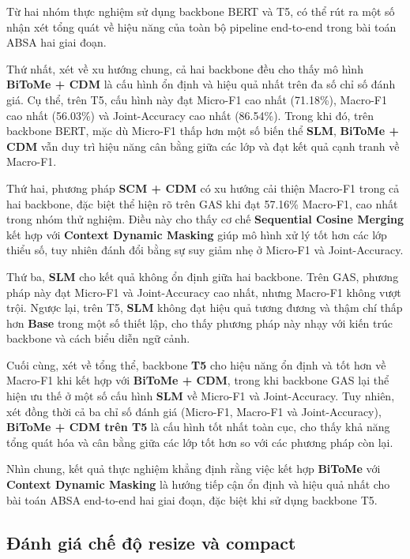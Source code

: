Từ hai nhóm thực nghiệm sử dụng backbone BERT và T5, có thể rút ra một số nhận xét tổng quát về hiệu năng của toàn bộ pipeline end-to-end trong bài toán ABSA hai giai đoạn.

Thứ nhất, xét về xu hướng chung, cả hai backbone đều cho thấy mô hình \textbf{BiToMe + CDM} là cấu hình ổn định và hiệu quả nhất trên đa số chỉ số đánh giá. Cụ thể, trên T5, cấu hình này đạt Micro-F1 cao nhất (71.18\%), Macro-F1 cao nhất (56.03\%) và Joint-Accuracy cao nhất (86.54\%). Trong khi đó, trên backbone BERT, mặc dù Micro-F1 thấp hơn một số biến thể \textbf{SLM}, \textbf{BiToMe + CDM} vẫn duy trì hiệu năng cân bằng giữa các lớp và đạt kết quả cạnh tranh về Macro-F1.

Thứ hai, phương pháp \textbf{SCM + CDM} có xu hướng cải thiện Macro-F1 trong cả hai backbone, đặc biệt thể hiện rõ trên GAS khi đạt 57.16\% Macro-F1, cao nhất trong nhóm thử nghiệm. Điều này cho thấy cơ chế \textbf{Sequential Cosine Merging} kết hợp với \textbf{Context Dynamic Masking} giúp mô hình xử lý tốt hơn các lớp thiểu số, tuy nhiên đánh đổi bằng sự suy giảm nhẹ ở Micro-F1 và Joint-Accuracy.

Thứ ba, \textbf{SLM} cho kết quả không ổn định giữa hai backbone. Trên GAS, phương pháp này đạt Micro-F1 và Joint-Accuracy cao nhất, nhưng Macro-F1 không vượt trội. Ngược lại, trên T5, \textbf{SLM} không đạt hiệu quả tương đương và thậm chí thấp hơn \textbf{Base} trong một số thiết lập, cho thấy phương pháp này nhạy với kiến trúc backbone và cách biểu diễn ngữ cảnh.

Cuối cùng, xét về tổng thể, backbone \textbf{T5} cho hiệu năng ổn định và tốt hơn về Macro-F1 khi kết hợp với \textbf{BiToMe + CDM}, trong khi backbone GAS lại thể hiện ưu thế ở một số cấu hình \textbf{SLM} về Micro-F1 và Joint-Accuracy. Tuy nhiên, xét đồng thời cả ba chỉ số đánh giá (Micro-F1, Macro-F1 và Joint-Accuracy), \textbf{BiToMe + CDM trên T5} là cấu hình tốt nhất toàn cục, cho thấy khả năng tổng quát hóa và cân bằng giữa các lớp tốt hơn so với các phương pháp còn lại.

Nhìn chung, kết quả thực nghiệm khẳng định rằng việc kết hợp \textbf{BiToMe} với \textbf{Context Dynamic Masking} là hướng tiếp cận ổn định và hiệu quả nhất cho bài toán ABSA end-to-end hai giai đoạn, đặc biệt khi sử dụng backbone T5.
\subsection{Đánh giá chế độ resize và compact}
\label{subsec:compact_vs_resize}


